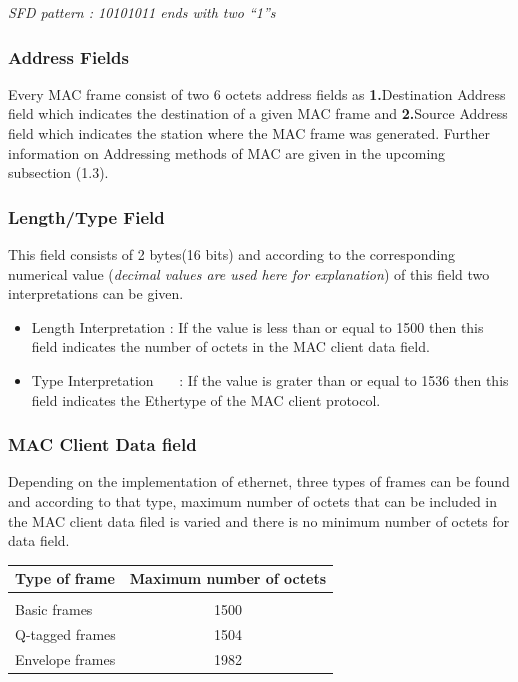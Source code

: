 \documentclass[a4paper,11pt]{article}%
\begin{document}
\textit{SFD pattern : 10101011 ends with two ``1''s}

\subsubsection{Address Fields}
Every MAC frame consist of two 6 octets address fields as \textbf{1.}Destination Address field  which indicates the destination of a given MAC frame and\textbf{ 2.}Source Address field which indicates the station where the MAC frame was generated. Further information on Addressing methods of MAC are given in the upcoming subsection (1.3).


\subsubsection{Length/Type Field}

This field consists of 2 bytes(16 bits) and according to the corresponding numerical value (\textit{decimal values are used here for explanation}) of this field two interpretations can be given.
\begin{itemize}
	\item Length Interpretation : If the value is less than or equal to 1500 then this field indicates the number of octets in the MAC client data field.
	\item Type Interpretation~~~ : If the value is grater than or equal to 1536 then this field indicates the Ethertype of the MAC client protocol.
\end{itemize}

\subsubsection{MAC Client Data field}
Depending on the implementation of ethernet, three types of frames can be found and according to that type, maximum number of octets that can be included in the MAC client data filed is varied and there is no minimum number of octets for data field.\\

\begin{center}
	\begin{tabular}{l |c}
	\textbf{Type of frame} & \textbf{Maximum number of octets}\\\hline
	&\\
	Basic frames &1500 \\
	Q-tagged frames&1504 \\
	Envelope frames &1982\\\hline\hline
	\end{tabular}
\end{center}
\end{document}
